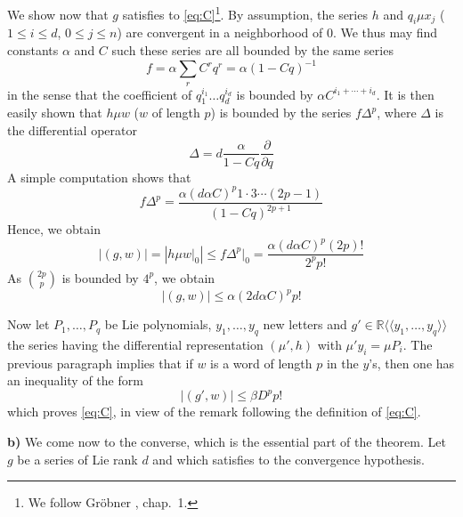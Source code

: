 \documentclass[a4paper,12pt]{article}
\newcommand{\R}{\mathbb{R}}
\begin{document}
We show now that $g$ satisfies to \eqref{eq:C}\footnote{We follow Gröbner \cite{6}, chap.\ 1.}. By assumption, the series $h$ and $q_i \mu x_j$ ($1 \leq i \leq d$, $0 \leq j \leq n$) are convergent in a neighborhood of $0$. We thus may find constants $\alpha$ and $C$ such these series are all bounded by the same series
\begin{equation*}
	f=\alpha \sum_r C^r q^r=\alpha(1-C q)^{-1}
\end{equation*}
in the sense that the coefficient of $q_1^{i_1} \ldots q_d^{i_d}$ is bounded by $\alpha C^{i_1 + \dotsb + i_d}$.
It is then easily shown that $h\mu w$ ($w$ of length $p$) is bounded by the series $f \Delta^p$, where $\Delta$ is the differential operator
\begin{equation*}
	\Delta={d} \frac{\alpha}{1-{Cq}} \frac{\partial}{\partial {q}}
\end{equation*}
A simple computation shows that
\begin{equation*}
	f \Delta^p=\frac{\alpha(d \alpha C)^p 1 \cdot 3 \dotsb (2 p-1)}{(1-C q)^{2 p+1}}
\end{equation*}
Hence, we obtain
\begin{equation*}
	|(g, w)|=\left|h \mu w \rvert_0\right| \leq f \Delta^p\rvert_0
	=\frac{\alpha(d \alpha C)^p(2 p) !}{2^p p !}
\end{equation*}
As ${2p}\choose{p}$ is bounded by $4^{{p}}$, we obtain
\begin{equation*}
	|(g, w)| \leq \alpha(2 d\alpha {C})^{{p}} {p}!
\end{equation*}

Now let ${P}_1, \ldots, P_q$ be Lie polynomials, ${y}_1, \ldots, {y}_{{q}}$ new letters and $g' \in \R\langle\langle{y}_1, \ldots, {y}_{{q}}\rangle\rangle$ the series having the differential representation $(\mu',h)$ with $\mu' {y}_i=\mu {P}_i$. The previous paragraph implies that if $w$ is a word of length ${p}$ in the $y$'s, then one has an inequality of the form
\begin{equation*}
	\left|(g', w)\right| \leq \beta D^p p !
\end{equation*}
which proves \eqref{eq:C}, in view of the remark following the definition of \eqref{eq:C}.

\bigskip


\textbf{b)} We come now to the converse, which is the essential part of the theorem. Let $g$ be a series of Lie rank $d$ and which satisfies to the convergence hypothesis.
\end{document}
